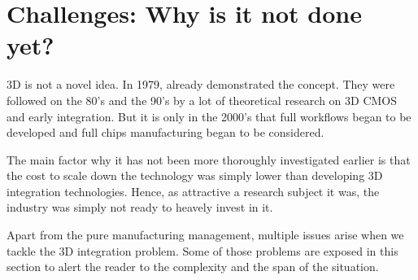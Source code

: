 \documentclass[11pt,a4paper]{report} %
\theoremstyle{customdef}
\begin{document}

\chapter{Challenges: Why is it not done yet?}\label{chap:challenges}
3D is not a novel idea. In 1979, \citet{Geis1979} already demonstrated the concept.
They were followed on the 80's \citep{Akasaka1986, Colinge1981, Goeloe1981, Kawamura1983, Kunio1989, Nakano1984, Nishimura1987, Sugahara1986, Terui1983} and the 90's \citep{Neudeck1999, Saraswat1999, Strickland1998, Subramanian1998} by a lot of theoretical research on 3D CMOS and early integration.
But it is only in the 2000's \citep{Souri2000} that full workflows began to be developed and full chips manufacturing began to be considered.

The main factor why it has not been more thoroughly investigated earlier is that the cost to scale down the technology was simply lower than developing 3D integration technologies.
Hence, as attractive a research subject it was, the industry was simply not ready to heavely invest in it.

Apart from the pure manufacturing management, multiple issues arise when we tackle the 3D integration problem.
Some of those problems are exposed in this section to alert the reader to the complexity and the span of the situation.

\end{document}
